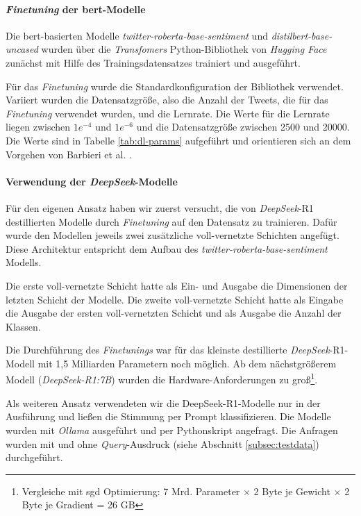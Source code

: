 \paragraph{\textit{Finetuning} der \gls{bert}-Modelle}

Die \gls{bert}-basierten Modelle \textit{twitter-roberta\hyp{}base\hyp{}sentiment} und \textit{distilbert-base-uncased} wurden über die \textit{Transfomers} Python-Bibliothek von \textit{Hugging Face} zunächst mit Hilfe des Trainingsdatensatzes trainiert und ausgeführt.

Für das \textit{Finetuning} wurde die Standardkonfiguration der Bibliothek verwendet.
Variiert wurden die Datensatzgröße, also die Anzahl der Tweets, die für das \textit{Finetuning} verwendet wurden, und die Lernrate.
Die Werte für die Lernrate liegen zwischen $1e^{-4}$ und $1e^{-6}$ und die Datensatzgröße zwischen 2500 und 20000. Die Werte sind in Tabelle \ref{tab:dl-params} aufgeführt und orientieren sich an dem Vorgehen von Barbieri et al. \cite{barbieri2020tweeteval}.

\paragraph{Verwendung der \textit{DeepSeek}-Modelle}

Für den eigenen Ansatz haben wir zuerst versucht, die von \textit{DeepSeek}-R1 destillierten Modelle durch \textit{Finetuning} auf den Datensatz zu trainieren.
Dafür wurde den Modellen jeweils zwei zusätzliche voll-vernetzte Schichten angefügt.
Diese Architektur entspricht dem Aufbau des \textit{twitter-roberta-base-sentiment} Modells.

Die erste voll-vernetzte Schicht hatte als Ein- und Ausgabe die Dimensionen der letzten Schicht der Modelle.
Die zweite voll-vernetzte Schicht hatte als Eingabe die Ausgabe der ersten voll-vernetzten Schicht und als Ausgabe die Anzahl der Klassen.

Die Durchführung des \textit{Finetunings} war für das kleinste destillierte \textit{DeepSeek}-R1-Modell mit 1,5 Milliarden Parametern noch möglich.
Ab dem nächstgrößerem Modell (\textit{DeepSeek-R1:7B}) wurden die Hardware-Anforderungen zu groß\footnote{Vergleiche mit \gls{sgd} Optimierung: 7 Mrd. Parameter $\times$ 2 Byte je Gewicht $\times$ 2 Byte je Gradient = 26 GB}.

Als weiteren Ansatz verwendeten wir die DeepSeek-R1-Modelle nur in der Ausführung und ließen die Stimmung per Prompt klassifizieren.
Die Modelle wurden mit \textit{Ollama} ausgeführt und per Pythonskript angefragt.
Die Anfragen wurden mit und ohne \textit{Query}-Ausdruck (siehe Abschnitt \ref{subsec:testdata}) durchgeführt.

